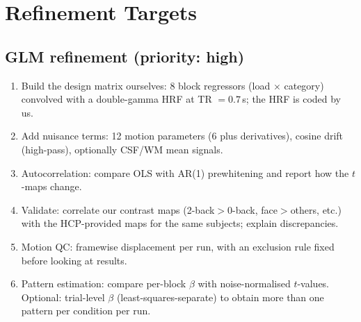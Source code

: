 \documentclass[11pt,a4paper]{article}
\begin{document}
\section{Refinement Targets}

\subsection{GLM refinement (priority: high)}
\begin{enumerate}
\item Build the design matrix ourselves: 8 block regressors (load $\times$ category) convolved with a double-gamma HRF at TR $=0.7$\,s; the HRF is coded by us.
\item Add nuisance terms: 12 motion parameters (6 plus derivatives), cosine drift (high-pass), optionally CSF/WM mean signals.
\item Autocorrelation: compare OLS with AR(1) prewhitening and report how the $t$-maps change.
\item Validate: correlate our contrast maps (2-back$>$0-back, face$>$others, etc.) with the HCP-provided maps for the same subjects; explain discrepancies.
\item Motion QC: framewise displacement per run, with an exclusion rule fixed before looking at results.
\item Pattern estimation: compare per-block $\beta$ with noise-normalised $t$-values. Optional: trial-level $\beta$ (least-squares-separate) to obtain more than one pattern per condition per run.
\end{enumerate}
\end{document}
